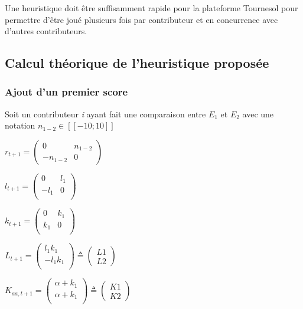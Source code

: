Une heuristique doit être suffisamment rapide pour la plateforme Tournesol pour permettre d'être joué plusieurs fois par contributeur et en concurrence avec d'autres contributeurs.


\subsection{Calcul théorique de l'heuristique proposée}

\subsubsection{Ajout d'un premier score}

Soit un contributeur \textit{i} ayant fait une comparaison entre $E_{1}$ et $E_{2}$ avec une notation $n_{1-2} \in [\![-10;10]\!]$

$r_{t+1}= \begin{pmatrix}
0 & n_{1-2} \\
-n_{1-2} & 0 
\end{pmatrix}$

$l_{t+1}= \begin{pmatrix}
0 & l_1 \\
-l_1 & 0 \\
\end{pmatrix}
$

$k_{t+1}= \begin{pmatrix}
0 & k_1 \\
k_1 & 0 \\
\end{pmatrix}
$


$L_{t+1}= \begin{pmatrix}
l_1 k_1\\
-l_1 k_1 \\
\end{pmatrix} \triangleq
\begin{pmatrix}
L1\\
L2
\end{pmatrix} 
$

$K_{aa,t+1}= \begin{pmatrix}
\alpha + k_1\\
\alpha +  k_1\\
\end{pmatrix} \triangleq
\begin{pmatrix}
K1\\
K2
\end{pmatrix} 
$

